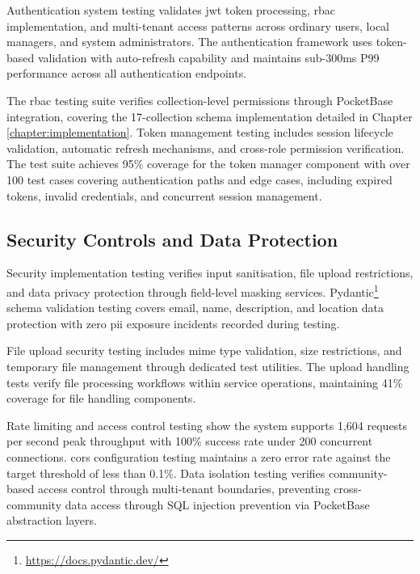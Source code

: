 Authentication system testing validates \ac{jwt} token processing, \ac{rbac} implementation, and multi-tenant access patterns across ordinary users, local managers, and system administrators. The authentication framework uses token-based validation with auto-refresh capability and maintains sub-300ms P99 performance across all authentication endpoints.

The \ac{rbac} testing suite verifies collection-level permissions through PocketBase integration, covering the 17-collection schema implementation detailed in Chapter \ref{chapter:implementation}. Token management testing includes session lifecycle validation, automatic refresh mechanisms, and cross-role permission verification. The test suite achieves 95\% coverage for the token manager component with over 100 test cases covering authentication paths and edge cases, including expired tokens, invalid credentials, and concurrent session management.

\subsection{Security Controls and Data Protection} \label{subsection:security_controls}

Security implementation testing verifies input sanitisation, file upload restrictions, and data privacy protection through field-level masking services. Pydantic\footnote{\url{https://docs.pydantic.dev/}} schema validation testing covers email, name, description, and location data protection with zero \ac{pii} exposure incidents recorded during testing.

File upload security testing includes \ac{mime} type validation, size restrictions, and temporary file management through dedicated test utilities. The upload handling tests verify file processing workflows within service operations, maintaining 41\% coverage for file handling components.

Rate limiting and access control testing show the system supports 1,604 requests per second peak throughput with 100\% success rate under 200 concurrent connections. \ac{cors} configuration testing maintains a zero error rate against the target threshold of less than 0.1\%. Data isolation testing verifies community-based access control through multi-tenant boundaries, preventing cross-community data access through SQL injection prevention via PocketBase abstraction layers.


